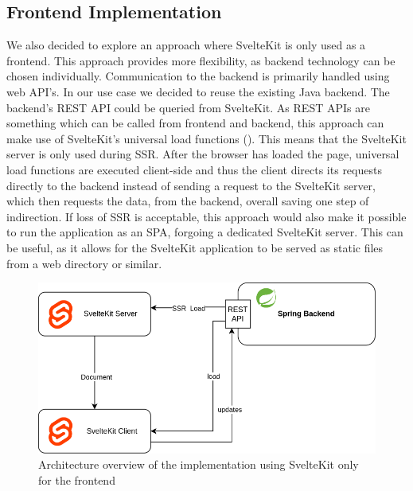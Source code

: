 \subsection{Frontend Implementation}


We also decided to explore an approach where SvelteKit is only used as a frontend. This approach provides more flexibility, as backend technology can be chosen individually. Communication to the backend is primarily handled using web API's. In our use case we decided to reuse the existing Java backend. The backend's REST API could be queried from SvelteKit. As REST APIs are something which can be called from frontend and backend, this approach can make use of SvelteKit's universal load functions (). This means that the SvelteKit server is only used during SSR. After the browser has loaded the page, universal load functions are executed client-side and thus the client directs its requests directly to the backend instead of sending  a request to the SvelteKit server, which then requests the data, from the backend, overall saving one step of indirection. If loss of SSR is acceptable, this approach would also make it possible to run the application as an SPA, forgoing a dedicated SvelteKit server. This can be useful, as it allows for the SvelteKit application to be served as static files from a web directory or similar.

\begin{figure}[ht]
    \centering
    \includegraphics[width=.6\linewidth]{assets/fe-only-client-takes-over}
    \caption{Architecture overview of the implementation using SvelteKit only for the frontend}
    \label{fig:dswfd-architecture-fe-only}
\end{figure}

